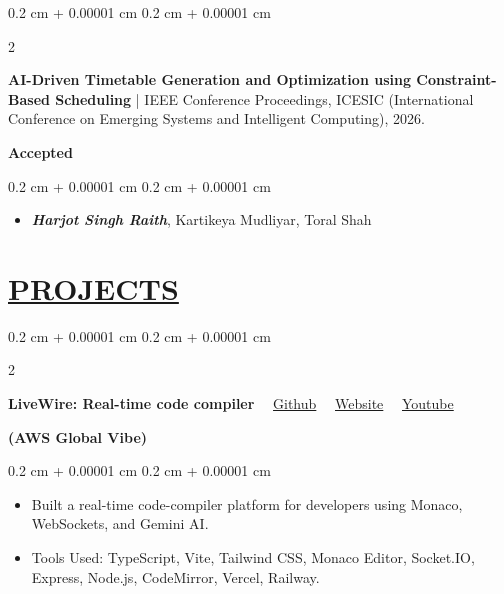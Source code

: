 \documentclass[10pt, letterpaper]{article}
\newenvironment{highlights}{
    \begin{itemize}[
        topsep=0.05 cm,
        parsep=0 cm,
        partopsep=0pt,
        itemsep=0pt,
        leftmargin=0.4 cm + 10pt
    ]
}{
    \end{itemize}
} %
\newenvironment{onecolentry}{
    \begin{adjustwidth}{
        0.2 cm + 0.00001 cm
    }{
        0.2 cm + 0.00001 cm
    }
}{
    \end{adjustwidth}
} %
\newenvironment{twocolentry}[2][]{
    \onecolentry
    \def\secondColumn{#2}
    \setcolumnwidth{\fill, 5.0 cm}
    \begin{paracol}{2}
}{
    \switchcolumn \raggedleft \secondColumn
    \end{paracol}
    \endonecolentry
} %
\begin{document}
\begin{samepage}
    \vspace{0.2 cm}
    
    \begin{twocolentry}{
        \textbf{Accepted}}
        \textbf{AI-Driven Timetable Generation and Optimization using Constraint-Based Scheduling} | IEEE Conference Proceedings, ICESIC (International Conference on Emerging Systems and Intelligent Computing), 2026.
    \end{twocolentry}
    
    \vspace{0.05 cm}
    \begin{onecolentry}
        \begin{highlights}
            \item \textbf{\textit{Harjot Singh Raith}}, Kartikeya Mudliyar, Toral Shah 
        \end{highlights}
    \end{onecolentry}
    
    \vspace{0.10 cm}
\end{samepage}


  \section{\href{https://www.harjot.info/\#Projects}{PROJECTS}}

\begin{twocolentry}{
    \textbf{(AWS Global Vibe)}
}
    \textbf{LiveWire: Real-time code compiler}~
    \faGithub~\href{https://github.com/Harjotraith04/LiveWire}{Github}~%
    \faGlobe~\href{https://live-wire-cn.vercel.app/}{Website}~%
    \faYoutube~\href{https://www.youtube.com/watch?v=NBiqMB7ju38}{Youtube}
\end{twocolentry}

\vspace{0.10 cm}
\begin{onecolentry}
    \begin{highlights}
        \item Built a real-time code-compiler platform for developers using Monaco, WebSockets, and Gemini AI.
        \item Tools Used: TypeScript, Vite, Tailwind CSS, Monaco Editor, Socket.IO, Express, Node.js, CodeMirror, Vercel, Railway.
    \end{highlights}
\end{onecolentry}

\vspace{0.2 cm}
\end{document}
